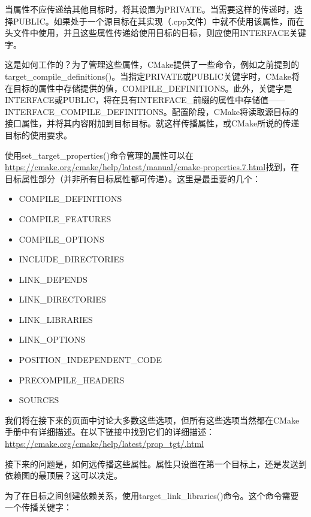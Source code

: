 当属性不应传递给其他目标时，将其设置为PRIVATE。当需要这样的传递时，选择PUBLIC。如果处于一个源目标在其实现（.cpp文件）中就不使用该属性，而在头文件中使用，并且这些属性传递给使用目标的目标，则应使用INTERFACE关键字。

这是如何工作的？为了管理这些属性，CMake提供了一些命令，例如之前提到的target\_compile\_definitions()。当指定PRIVATE或PUBLIC关键字时，CMake将在目标的属性中存储提供的值，COMPILE\_DEFINITIONS。此外，关键字是INTERFACE或PUBLIC，将在具有INTERFACE\_前缀的属性中存储值——INTERFACE\_COMPILE\_DEFINITIONS。配置阶段，CMake将读取源目标的接口属性，并将其内容附加到目标目标。就这样传播属性，或CMake所说的传递目标的使用要求。

使用set\_target\_properties()命令管理的属性可以在\url{https://cmake.org/cmake/help/latest/manual/cmake-properties.7.html}找到，在目标属性部分（并非所有目标属性都可传递）。这里是最重要的几个：

\begin{itemize}
\item
COMPILE\_DEFINITIONS

\item
COMPILE\_FEATURES

\item
COMPILE\_OPTIONS

\item
INCLUDE\_DIRECTORIES

\item
LINK\_DEPENDS

\item
LINK\_DIRECTORIES

\item
LINK\_LIBRARIES

\item
LINK\_OPTIONS

\item
POSITION\_INDEPENDENT\_CODE

\item
PRECOMPILE\_HEADERS

\item
SOURCES
\end{itemize}

我们将在接下来的页面中讨论大多数这些选项，但所有这些选项当然都在CMake手册中有详细描述。在以下链接中找到它们的详细描述：\url{https://cmake.org/cmake/help/latest/prop_tgt/.html}

接下来的问题是，如何远传播这些属性。属性只设置在第一个目标上，还是发送到依赖图的最顶层？这可以决定。

为了在目标之间创建依赖关系，使用target\_link\_libraries()命令。这个命令需要一个传播关键字：

